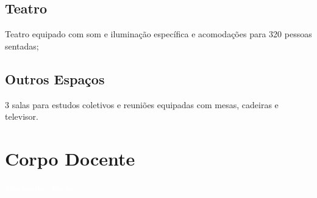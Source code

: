 \documentclass[11pt,fleqn]{book} %
\begin{document}
\section{Teatro}
Teatro equipado com som e iluminação específica e acomodações para 320 pessoas sentadas;

\section{Outros Espaços}
3 salas para estudos coletivos e reuniões equipadas com mesas, cadeiras e televisor.


\chapter{Corpo Docente}\label{docentes}
\vspace{6em}
\begin{flushright}
	\textit{\textcolor{white}{Um bonita citação...}}
\end{flushright}
\vspace{12em}
\end{document}
